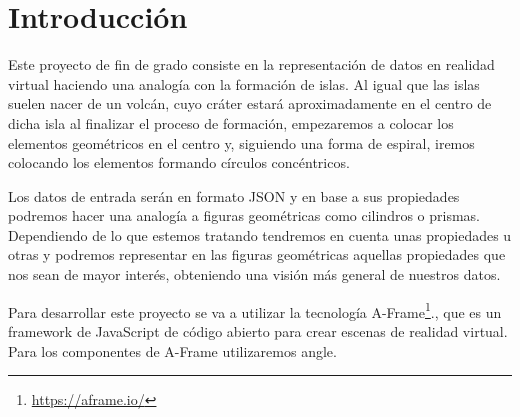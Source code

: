 \documentclass[a4paper, 12pt]{book}
\begin{document}
\tableofcontents 
\cleardoublepage
\listoffigures %



\cleardoublepage
\chapter{Introducción}
\label{sec:intro} %

Este proyecto de fin de grado consiste en la representación de datos en realidad virtual haciendo una analogía con la formación de islas. Al igual que las islas suelen nacer de un volcán, cuyo cráter estará aproximadamente en el centro de dicha isla al finalizar el proceso de formación, empezaremos a colocar los elementos geométricos en el centro y, siguiendo una forma de espiral, iremos colocando los elementos formando círculos concéntricos.

Los datos de entrada serán en formato JSON y en base a sus propiedades podremos hacer una analogía a figuras geométricas como cilindros o prismas. Dependiendo de lo que estemos tratando tendremos en cuenta unas propiedades u otras y podremos representar en las figuras geométricas aquellas propiedades que nos sean de mayor interés, obteniendo una visión más general de nuestros datos.

Para desarrollar este proyecto se va a utilizar la tecnología A-Frame\footnote{\url{https://aframe.io/}}., que es un framework de JavaScript de código abierto para crear escenas de realidad virtual. Para los componentes de A-Frame utilizaremos angle.




\end{document}
